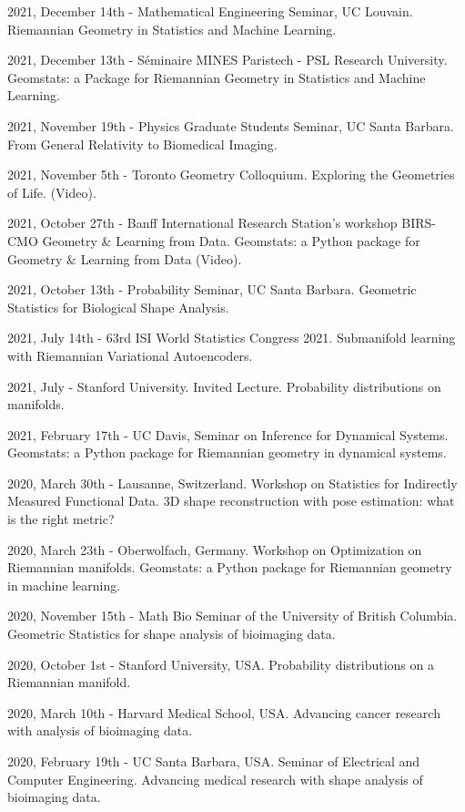 2021, December 14th - Mathematical Engineering Seminar, UC Louvain. Riemannian Geometry in Statistics and Machine Learning.

2021, December 13th - Séminaire MINES Paristech - PSL Research University. Geomstats: a Package for Riemannian Geometry in Statistics and Machine Learning.

2021, November 19th - Physics Graduate Students Seminar, UC Santa Barbara. From General Relativity to Biomedical Imaging.

2021, November 5th - Toronto Geometry Colloquium. Exploring the Geometries of Life. (Video). 

2021, October 27th - Banff International Research Station's workshop BIRS-CMO Geometry \& Learning from Data. Geomstats: a Python package for Geometry \& Learning from Data (Video).

2021, October 13th - Probability Seminar, UC Santa Barbara. Geometric Statistics for Biological Shape Analysis.

2021, July 14th - 63rd ISI World Statistics Congress 2021. Submanifold learning with Riemannian Variational Autoencoders.

2021, July - Stanford University. Invited Lecture. Probability distributions on manifolds.

2021, February 17th - UC Davis, Seminar on Inference for Dynamical Systems. Geomstats: a Python package for Riemannian geometry in dynamical systems.

2020, March 30th - Lausanne, Switzerland. Workshop on Statistics for Indirectly Measured Functional Data. 3D shape reconstruction with pose estimation: what is the right metric?

2020, March 23th - Oberwolfach, Germany. Workshop on Optimization on Riemannian manifolds. Geomstats: a Python package for Riemannian geometry in machine learning.

2020, November 15th - Math Bio Seminar of the University of British Columbia. Geometric Statistics for shape analysis of bioimaging data.

2020, October  1st - Stanford University, USA. Probability distributions on a Riemannian manifold.

2020, March 10th - Harvard Medical School, USA. Advancing cancer research with analysis of bioimaging data.

2020, February 19th - UC Santa Barbara, USA. Seminar of Electrical and Computer Engineering. Advancing medical research with shape analysis of bioimaging data.

